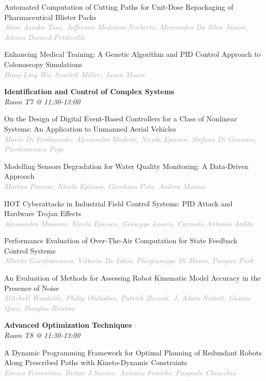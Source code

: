 \begin{multicols*}{2}
\small Automated Computation of Cutting Paths for Unit-Dose Repackaging of Pharmaceutical Blister Packs\\ 
\footnotesize \textcolor{darkgray}{\textit{Aline Assaka Tani, Jefferson Medeiros  Norberto, Marcondes  Da Silva Júnior, Adrien  Durand-Petiteville}}

\small Enhancing Medical Training: A Genetic Algorithm and PID Control Approach to Colonoscopy Simulations\\ 
\footnotesize \textcolor{darkgray}{\textit{Hang-Ling Wu, Scarlett  Miller, Jason  Moore}}

\normalsize \textbf{Identification and Control of Complex Systems}\\
\small \textit{Room T7 @ 11:30-13:00}

\small On the Design of Digital Event-Based Controllers for a Class of Nonlinear Systems: An Application to Unmanned Aerial Vehicles\\ 
\footnotesize \textcolor{darkgray}{\textit{Mario Di Ferdinando, Alessandro  Modesti, Nicola  Epicoco, Stefano  Di Gennaro, Pierdomenico  Pepe}}

\small Modelling Sensors Degradation for Water Quality Monitoring: A Data-Driven Approach\\ 
\footnotesize \textcolor{darkgray}{\textit{Marino Pavone, Nicola  Epicoco, Giordano  Pola, Andrea  Manno}}

\small IIOT Cyberattacks in Industrial Field Control Systems: PID Attack and Hardware Trojan Effects\\ 
\footnotesize \textcolor{darkgray}{\textit{Alessandro Massaro, Nicola  Epicoco, Giuseppe  Loseto, Carmelo Antonio  Ardito}}

\small Performance Evaluation of Over-The-Air Computation for State Feedback Control Systems\\ 
\footnotesize \textcolor{darkgray}{\textit{Alberto Gianfrancesco, Vittorio  De Iuliis, Piergiuseppe  Di Marco, Pangun  Park}}

\small An Evaluation of Methods for Assessing Robot Kinematic Model Accuracy in the Presence of Noise\\ 
\footnotesize \textcolor{darkgray}{\textit{Mitchell Woodside, Philip  Olubodun, Patrick  Bazzoli, J. Adam  Nisbett, Guixiu  Qiao, Douglas  Bristow}}

\normalsize \textbf{Advanced Optimization Techniques}\\
\small \textit{Room T8 @ 11:30-13:00}

\small A Dynamic Programming Framework for Optimal Planning of Redundant Robots Along Prescribed Paths with Kineto-Dynamic Constraints\\ 
\footnotesize \textcolor{darkgray}{\textit{Enrico Ferrentino, Heitor J  Savino, Antonio  Franchi, Pasquale  Chiacchio}}


\end{multicols*}

